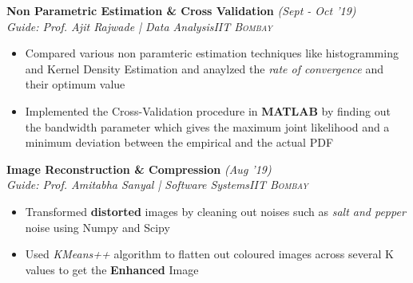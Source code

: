 \documentclass{article}
\begin{document}
\vspace{-5pt}
\textbf{Non Parametric Estimation \& Cross Validation} \hfill{\sl \small (Sept - Oct '19)}\\{\it Guide: Prof. Ajit Rajwade | Data Analysis}\hfill{\sl \small \textsc{IIT Bombay}}\\
\vspace{-19pt}
\begin{itemize}[itemsep = -1 mm, leftmargin=*]
  \item Compared various non paramteric estimation techniques like histogramming and Kernel Density Estimation and anaylzed the \textit{rate of convergence} and their optimum value
    \item Implemented the Cross-Validation procedure in \textbf{MATLAB} by finding out the bandwidth parameter which gives the maximum joint likelihood and a minimum deviation between the empirical and the actual PDF
\end{itemize}
 \vspace{-5pt}
 \textbf{Image Reconstruction \& Compression} \hfill{\sl \small (Aug '19)}\\
 {\it Guide: Prof. Amitabha Sanyal | Software Systems}\hfill{\sl \small \textsc{IIT Bombay}}\\
 \vspace{-19pt}
 \begin{itemize}[itemsep = -1 mm, leftmargin=*]
   \item Transformed {\bf distorted} images by cleaning out noises such as {\it salt and pepper} noise using Numpy and Scipy
   \item Used {\it KMeans++} algorithm to flatten out coloured images across several K values to get the {\bf Enhanced} Image  
 \end{itemize}
\end{document}
